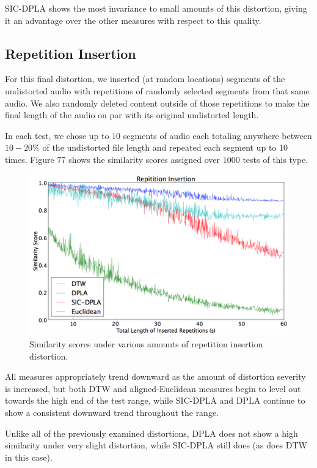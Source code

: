 \documentclass[12pt]{report} 	%
\numberwithin{figure}{chapter}
\numberwithin{table}{chapter}
\numberwithin{equation}{chapter}
\begin{document}
\begin{flushleft}
SIC-DPLA shows the most invariance to small amounts of this distortion, giving it an advantage over the other measures with respect to this quality.

\subsection{Repetition Insertion}
For this final distortion, we inserted (at random locations) segments of the undistorted audio with repetitions of randomly selected segments from that same audio. We also randomly deleted content outside of those repetitions to make the final length of the audio on par with its original undistorted length.

In each test, we chose up to $10$ segments of audio each totaling anywhere between $10-20\%$ of the undistorted file length and repeated each segment up to 10 times. Figure 77 shows the similarity scores assigned over $1000$ tests of this type.
\begin{figure}[h!]
\begin{center}
\includegraphics[scale=0.5,width=\linewidth]{RepetitionInsertion}
\caption[Repetition insertion results]{Similarity scores under various amounts of repetition insertion distortion.}
\end{center}
\end{figure}

All measures appropriately trend downward as the amount of distortion severity is increased, but both DTW and aligned-Euclidean measures begin to level out towards the high end of the test range, while SIC-DPLA and DPLA continue to show a consistent downward trend throughout the range. 

Unlike all of the previously examined distortions, DPLA does not show a high similarity under very slight distortion, while SIC-DPLA still does (as does DTW in this case).


\end{flushleft}
\end{document}
